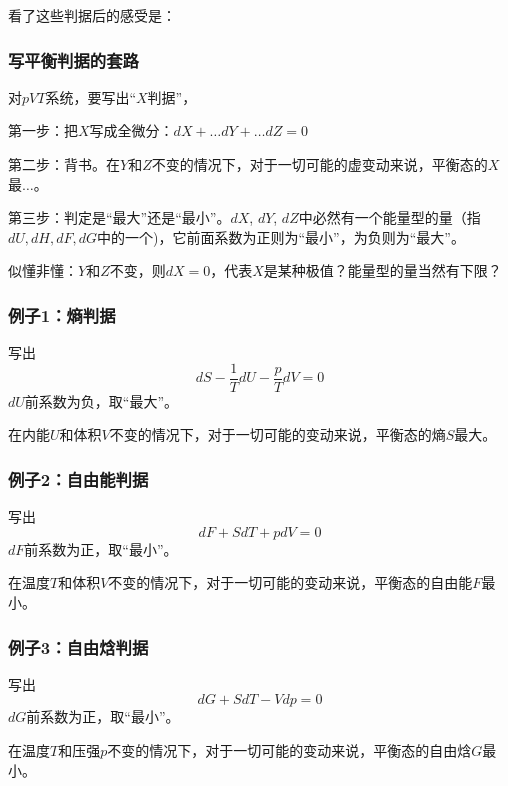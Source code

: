 \documentclass[CJK,14pt]{beamer}
\begin{document}
\begin{frame}

  看了这些判据后的感受是：

  \skipline


\end{frame}


\begin{frame}
\frametitle{写平衡判据的套路}

对$pVT$系统，要写出“$X$判据”，

\bitem
\item{第一步：把$X$写成全微分：$dX + \ldots dY + \ldots dZ = 0$}
\item{第二步：背书。在$Y$和$Z$不变的情况下，对于一切可能的虚变动来说，平衡态的$X$最$\ldots$。}
\item{第三步：判定是“最大”还是“最小”。$dX$, $dY$, $dZ$中必然有一个能量型的量（指$dU, dH, dF, dG$中的一个)，它前面系数为正则为“最小”，为负则为“最大”。}
\eitem

{\small

似懂非懂：$Y$和$Z$不变，则$dX = 0$，代表$X$是某种极值？能量型的量当然有下限？
}

\end{frame}


\begin{frame}
\frametitle{例子1：熵判据}

写出
$$dS - \frac{1}{T} dU - \frac{p}{T} dV = 0 $$
$dU$前系数为负，取“最大”。

\skipline

{\blue 在内能$U$和体积$V$不变的情况下，对于一切可能的变动来说，平衡态的熵$S$最大。}

\end{frame}



\begin{frame}
\frametitle{例子2：自由能判据}

写出
$$dF  + S dT + p dV = 0 $$
$dF$前系数为正，取“最小”。


\skipline

{\blue 在温度$T$和体积$V$不变的情况下，对于一切可能的变动来说，平衡态的自由能$F$最小。}


\end{frame}



\begin{frame}
\frametitle{例子3：自由焓判据}

写出
$$dG + S dT - V dp = 0$$
$dG$前系数为正，取“最小”。

\skipline

{\blue 在温度$T$和压强$p$不变的情况下，对于一切可能的变动来说，平衡态的自由焓$G$最小。}


\end{frame}
\end{document}
